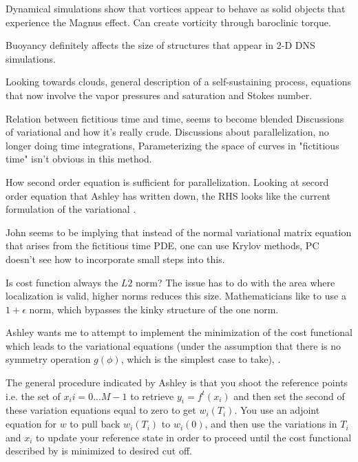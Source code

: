 \begin{description}
{\begin{description}
Dynamical simulations show that vortices appear to behave as solid objects that
experience the Magnus effect. Can create vorticity through baroclinic torque.

Buoyancy definitely affects the size of structures that appear in 2-D DNS
simulations.

Looking towards clouds, general description of a self-sustaining process,
equations that now involve the vapor pressures and saturation and Stokes
number.

\item[Solving Turbulence Debrief]
Relation between fictitious time and time, seems to become blended
Discussions of variational {\descent} and how it's really crude.
Discussions about parallelization, no longer doing time integrations,
Parameterizing the space of curves in "fictitious time" isn't obvious
in this method.

How second order equation is sufficient for parallelization.
Looking at secord order equation that Ashley has written down,
the RHS looks like the current formulation of the variational {\descent}.

John seems to be implying that instead of the normal variational {\descent} matrix equation that arises from the fictitious time PDE, one
can use Krylov methods, PC doesn't see how to incorporate small steps
into this.

Is cost function always the $L2$ norm? The issue has to do with the area
where localization is valid, higher norms reduces this size.
Mathematicians like to use a $1+ \epsilon$ norm, which bypasses the
kinky structure of the one norm.

\item[Cost functional version of multishooting]
Ashley wants me to attempt to implement the minimization of the cost
functional  which leads to the variational
equations (under the assumption that there is no symmetry operation
$g(\phi)$, which is the simplest case to take),
.

The general procedure indicated by Ashley is that you shoot the reference points
i.e. the set of $x_i  i = 0 ... M-1$ to retrieve $y_i = f^{t}(x_i)$ and then
set the second of these variation equations equal to zero to get $w_{i}(T_i)$.
You use an adjoint equation for $w$ to pull back $w_{i}(T_i)$ to $w_{i}(0)$,
and then use the variations in $T_i$ and $x_i$ to update your reference state in
order to proceed until the cost functional described by  is
minimized to desired cut off.


\end{description}}
\end{description}
